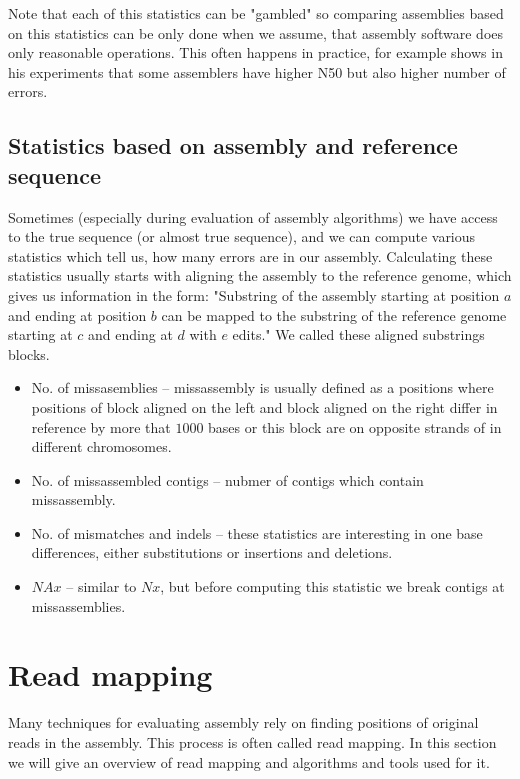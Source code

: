 Note that each of this statistics can be "gambled" so comparing assemblies based
on this statistics can be only done when we assume, that assembly software does only
reasonable operations. This often happens in practice, for example
\citet{gage} shows in his experiments that some assemblers have
higher N50 but also higher number of errors. 

\subsection{Statistics based on assembly and reference sequence}

Sometimes (especially during evaluation of assembly algorithms) we have access to 
the true sequence
(or almost true sequence), and we can compute various statistics which tell us, how many
errors are in our assembly.
Calculating these statistics usually starts with aligning the assembly to the
reference genome, which
gives us information in the form:
"Substring of the assembly starting at position $a$ and ending at position $b$ can be mapped
to the substring of the reference genome starting at $c$ and ending at $d$ with $e$ edits."
We called these aligned substrings blocks. 

\begin{itemize}
\item No. of missasemblies -- missassembly is usually defined as a positions where
positions of block aligned on the left and block aligned on the right differ in reference
by more that $1000$ bases or this block are on opposite strands of in different chromosomes.
\item No. of missassembled contigs -- nubmer of contigs which contain missassembly.
\item No. of mismatches and indels -- these statistics are interesting in one base differences,
either substitutions or insertions and deletions.
\item $NAx$ -- similar to $Nx$, but before computing this statistic we break
contigs at missassemblies.
\end{itemize}

\section{Read mapping}

Many techniques for evaluating assembly rely on finding
positions of original reads in the assembly. This process is often called read mapping.
In this section we will give an overview of read mapping and algorithms and tools used for it.

